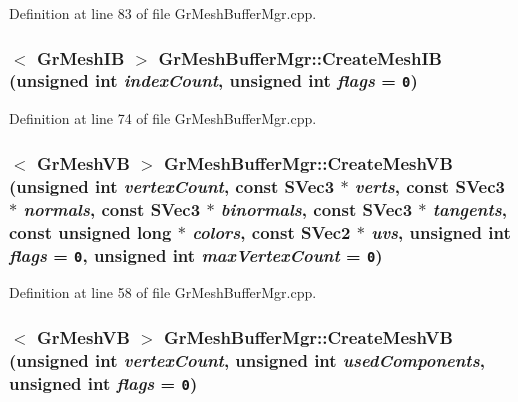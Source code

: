 Definition at line 83 of file GrMeshBufferMgr.cpp.\hypertarget{class_gr_mesh_buffer_mgr_91c2e8bf41d8e63797ace280348679eb}{
\subsubsection[{CreateMeshIB}]{$<$ {\bf GrMeshIB} $>$ GrMeshBufferMgr::CreateMeshIB (unsigned int {\em indexCount}, \/  unsigned int {\em flags} = {\tt 0})}}
\label{class_gr_mesh_buffer_mgr_91c2e8bf41d8e63797ace280348679eb}




Definition at line 74 of file GrMeshBufferMgr.cpp.\hypertarget{class_gr_mesh_buffer_mgr_6cef06c50c3ebb42829bc659c295f3de}{
\subsubsection[{CreateMeshVB}]{$<$ {\bf GrMeshVB} $>$ GrMeshBufferMgr::CreateMeshVB (unsigned int {\em vertexCount}, \/  const {\bf SVec3} $\ast$ {\em verts}, \/  const {\bf SVec3} $\ast$ {\em normals}, \/  const {\bf SVec3} $\ast$ {\em binormals}, \/  const {\bf SVec3} $\ast$ {\em tangents}, \/  const unsigned long $\ast$ {\em colors}, \/  const {\bf SVec2} $\ast$ {\em uvs}, \/  unsigned int {\em flags} = {\tt 0}, \/  unsigned int {\em maxVertexCount} = {\tt 0})}}
\label{class_gr_mesh_buffer_mgr_6cef06c50c3ebb42829bc659c295f3de}




Definition at line 58 of file GrMeshBufferMgr.cpp.\hypertarget{class_gr_mesh_buffer_mgr_e2becc9588cfb3d8858a4c998bc3dbc6}{
\subsubsection[{CreateMeshVB}]{$<$ {\bf GrMeshVB} $>$ GrMeshBufferMgr::CreateMeshVB (unsigned int {\em vertexCount}, \/  unsigned int {\em usedComponents}, \/  unsigned int {\em flags} = {\tt 0})}}
\label{class_gr_mesh_buffer_mgr_e2becc9588cfb3d8858a4c998bc3dbc6}




